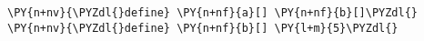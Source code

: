 \begin{Verbatim}[commandchars=\\\{\}]
\PY{n+nv}{\PYZdl{}define} \PY{n+nf}{a}[] \PY{n+nf}{b}[]\PYZdl{}
\PY{n+nv}{\PYZdl{}define} \PY{n+nf}{b}[] \PY{l+m}{5}\PYZdl{}
\end{Verbatim}
